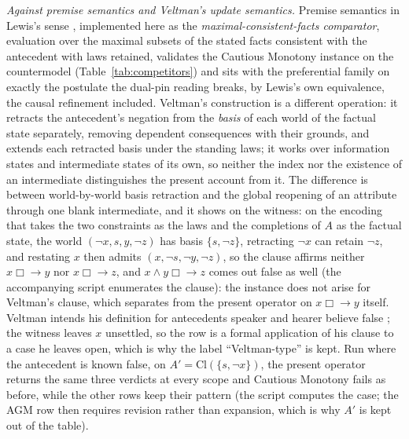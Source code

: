 \textit{Against premise semantics and Veltman's update semantics.} Premise semantics in Lewis's sense \parencite*{lewis1981}, implemented here as the \emph{maximal-consistent-facts comparator}, evaluation over the maximal subsets of the stated facts consistent with the antecedent with laws retained, validates the Cautious Monotony instance on the countermodel (Table~\ref{tab:competitors}) and sits with the preferential family on exactly the postulate the dual-pin reading breaks, by Lewis's own equivalence, the causal refinement \parencite{schulz2011} included. Veltman's construction \parencite*{veltman2005} is a different operation: it retracts the antecedent's negation from the \emph{basis} of each world of the factual state separately, removing dependent consequences with their grounds, and extends each retracted basis under the standing laws; it works over information states and intermediate states of its own, so neither the index nor the existence of an intermediate distinguishes the present account from it. The difference is between world-by-world basis retraction and the global reopening of an attribute through one blank intermediate, and it shows on the witness: on the encoding that takes the two constraints as the laws and the completions of $A$ as the factual state, the world $(\neg x, s, y, \neg z)$ has basis $\{s, \neg z\}$, retracting $\neg x$ can retain $\neg z$, and restating $x$ then admits $(x, \neg s, \neg y, \neg z)$, so the clause affirms neither $x \mathrel{\Box\!\!\rightarrow} y$ nor $x \mathrel{\Box\!\!\rightarrow} z$, and $x \wedge y \mathrel{\Box\!\!\rightarrow} z$ comes out false as well (the accompanying script enumerates the clause): the instance does not arise for Veltman's clause, which separates from the present operator on $x \mathrel{\Box\!\!\rightarrow} y$ itself. Veltman intends his definition for antecedents speaker and hearer believe false \parencite[n.~16]{veltman2005}; the witness leaves $x$ unsettled, so the row is a formal application of his clause to a case he leaves open, which is why the label ``Veltman-type'' is kept. Run where the antecedent is known false, on $A' = \mathrm{Cl}(\{s, \neg x\})$, the present operator returns the same three verdicts at every scope and Cautious Monotony fails as before, while the other rows keep their pattern (the script computes the case; the AGM row then requires revision rather than expansion, which is why $A'$ is kept out of the table).

